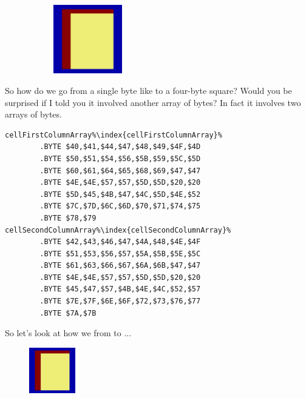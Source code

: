 \begin{figure}[H]
{\begin{adjustbox}{width=15cm,center}
\begin{subfigure}{0.3\textwidth}
        \caption{}
      \end{subfigure}
      \begin{subfigure}{0.3\textwidth}
        \includegraphics[width=3cm]{src/bonusphase/row21_cell4.png}%
        \caption{}
      \end{subfigure}
    \end{adjustbox}
  }
\end{figure}
\captionsetup[subfigure]{font=footnotesize,labelfont=footnotesize,labelformat=empty}

So how do we go from a single byte like  to a four-byte square? Would you be surprised
if I told you it involved another array of bytes? In fact it involves two arrays of bytes.

\begin{lstlisting}[escapechar=\%]
cellFirstColumnArray%\index{cellFirstColumnArray}%
        .BYTE $40,$41,$44,$47,$48,$49,$4F,$4D
        .BYTE $50,$51,$54,$56,$5B,$59,$5C,$5D
        .BYTE $60,$61,$64,$65,$68,$69,$47,$47
        .BYTE $4E,$4E,$57,$57,$5D,$5D,$20,$20
        .BYTE $5D,$45,$4B,$47,$4C,$5D,$4E,$52
        .BYTE $7C,$7D,$6C,$6D,$70,$71,$74,$75
        .BYTE $78,$79
cellSecondColumnArray%\index{cellSecondColumnArray}%   
        .BYTE $42,$43,$46,$47,$4A,$48,$4E,$4F
        .BYTE $51,$53,$56,$57,$5A,$5B,$5E,$5C
        .BYTE $61,$63,$66,$67,$6A,$6B,$47,$47
        .BYTE $4E,$4E,$57,$57,$5D,$5D,$20,$20
        .BYTE $45,$47,$57,$4B,$4E,$4C,$52,$57
        .BYTE $7E,$7F,$6E,$6F,$72,$73,$76,$77
        .BYTE $7A,$7B
\end{lstlisting}


So let's look at how we from  to ...

\begin{figure}[H]
  {
    \begin{adjustbox}{width=2cm,center}
        \includegraphics[width=2cm]{src/bonusphase/row21_cell0.png}%
    \end{adjustbox}
  }
\end{figure}

